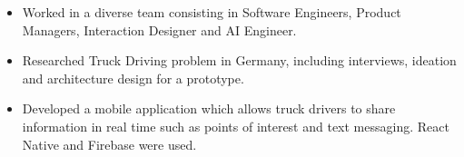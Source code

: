 \documentclass[10pt,a4paper]{altacv}
\begin{document}

\begin{fullwidth}
\makecvheader
\end{fullwidth}




\begin{itemize}

\item Worked in a diverse team consisting in Software Engineers, Product Managers, Interaction Designer and AI Engineer.

\item Researched Truck Driving problem in Germany, including interviews, ideation and architecture design for a prototype.

\item Developed a mobile application which allows truck drivers to share information in real time such as points of interest and text messaging. React Native and Firebase were used.
  
\end{itemize}

\divider
\end{document}
